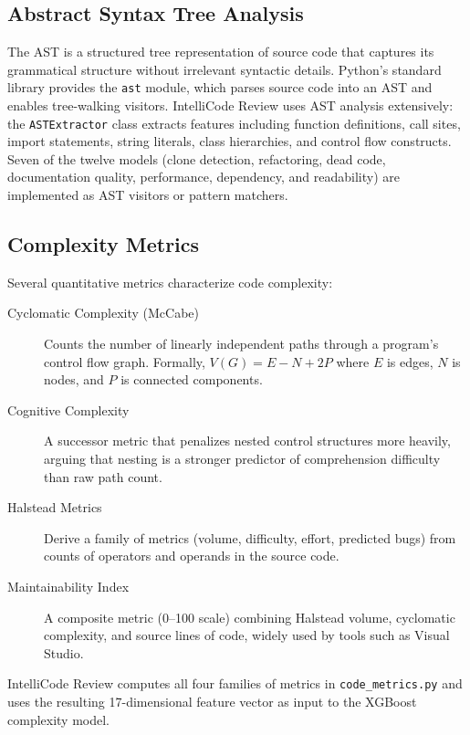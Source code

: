 \documentclass[12pt, oneside]{report}
\begin{document}
\subsection{Abstract Syntax Tree Analysis}

The \ac{AST} is a structured tree representation of source code that captures its grammatical
structure without irrelevant syntactic details. Python's standard library provides the
\texttt{ast} module, which parses source code into an AST and enables tree-walking
visitors. IntelliCode Review uses AST analysis extensively: the \texttt{ASTExtractor}
class extracts features including function definitions, call sites, import statements,
string literals, class hierarchies, and control flow constructs. Seven of the twelve
models (clone detection, refactoring, dead code, documentation quality, performance,
dependency, and readability) are implemented as AST visitors or pattern matchers.

\subsection{Complexity Metrics}

Several quantitative metrics characterize code complexity:

\begin{description}
  \item[Cyclomatic Complexity (McCabe)~\cite{mccabe1976}] Counts the number of linearly
    independent paths through a program's control flow graph. Formally, $V(G) = E - N + 2P$
    where $E$ is edges, $N$ is nodes, and $P$ is connected components.
  \item[Cognitive Complexity~\cite{campbell2018}] A successor metric that penalizes
    nested control structures more heavily, arguing that nesting is a stronger predictor
    of comprehension difficulty than raw path count.
  \item[Halstead Metrics~\cite{halstead1977}] Derive a family of metrics (volume, difficulty,
    effort, predicted bugs) from counts of operators and operands in the source code.
  \item[Maintainability Index~\cite{oman1992}] A composite metric (0--100 scale) combining
    Halstead volume, cyclomatic complexity, and source lines of code, widely used by
    tools such as Visual Studio.
\end{description}

IntelliCode Review computes all four families of metrics in \texttt{code\_metrics.py} and
uses the resulting 17-dimensional feature vector as input to the XGBoost complexity model.
\end{document}
